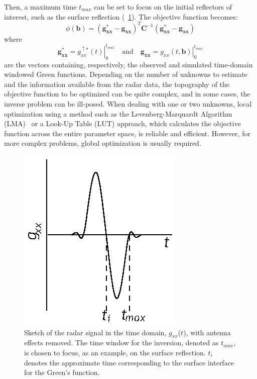 Then, a maximum time $t_{max}$ can be set to focus on the initial reflectors of interest, such as the surface reflection (\fig~\ref{fig:radar-challenges:tw}). The objective function becomes:
\begin{equation}\label{eq:radar-challenges:OFTD}
\phi(\mathbf{b})=
\left(\mathbf{g_{xx}^{*}}-\mathbf{g_{xx}}\right)^T\mathbf{C}^{-1}
\left(\mathbf{g_{xx}^{*}}-\mathbf{g_{xx}}\right)
\end{equation}
where
\begin{equation}\label{eq:radar-challenges:tmax}
\mathbf{g_{xx}^{*}}=\left.g_{xx}^{\uparrow*}(t)\right|_{0}^{t_{max}}
\quad\text{and}\quad
\mathbf{g_{xx}}=\left.g_{xx}(t,\mathbf{b})\right|_{0}^{t_{max}}
\end{equation}
are the vectors containing, respectively, the observed and simulated
time-domain windowed Green functions. Depending on the number of unknowns to estimate and the information available from the radar data, the topography of the objective function to be optimized can be quite complex, and in some cases, the inverse problem can be ill-posed. When dealing with one or two unknowns, local optimization using a method such as the Levenberg-Marquardt Algorithm (LMA)~\cite{Marquardt:1963} or a Look-Up Table (LUT) approach, which calculates the objective function across the entire parameter space, is reliable and efficient. However, for more complex problems, global optimization is usually required. 

\begin{figure}[t]
\noindent \centering

\includegraphics[width=0.4\columnwidth,trim={0 0 0 0.6cm},clip]{Figures/RadarChallenges/Theory/twr.eps}
\vspace{-4pt}
\caption{Sketch of the radar signal in the time domain, $g_{xx}$($t$), with antenna effects removed. The time window for the inversion, denoted as $t_{max}$, is chosen to focus, as an example, on the surface reflection. $t_i$ denotes the approximate time corresponding to the surface interface for the Green's function.} 
\label{fig:radar-challenges:tw}
\vspace{-12pt}
\end{figure}


